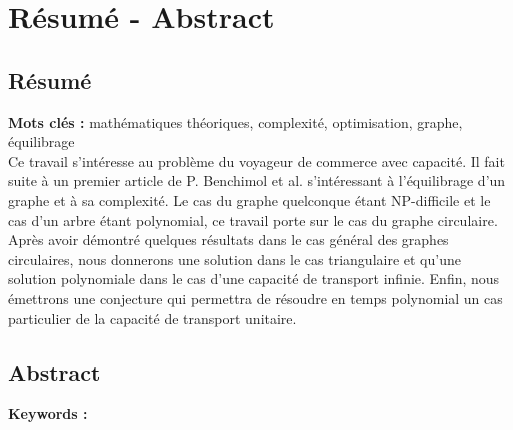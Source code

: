 \chapter*{Résumé - Abstract}

\section*{Résumé}

\textbf{Mots clés :} mathématiques théoriques, complexité, optimisation, graphe, équilibrage
\\

Ce travail s'intéresse au problème du voyageur de commerce avec capacité. Il fait suite à un premier article de P. Benchimol et al. s'intéressant à l'équilibrage d'un graphe et à sa complexité. Le cas du graphe quelconque étant NP-difficile et le cas d'un arbre étant polynomial, ce travail porte sur le cas du graphe circulaire. Après avoir démontré quelques résultats dans le cas général des graphes circulaires, nous donnerons une solution dans le cas triangulaire et qu'une solution polynomiale dans le cas d'une capacité de transport infinie. Enfin, nous émettrons une conjecture qui permettra de résoudre en temps polynomial un cas particulier de la capacité de transport unitaire.
\\[1cm]

\section*{Abstract}

\textbf{Keywords :}
